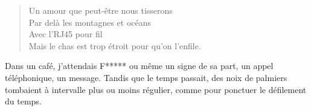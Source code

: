 \begin{verse}%
  \quatrain%
  Un amour que peut-être nous tisserons\\  %
  Par delà les montagnes et océans\\  %
  Avec l’RJ45 pour fil\\  %
  Mais le chas est trop étroit pour qu’on l’enfile.
\end{verse}

\begin{prose}
  Dans un café, j’attendais F***** ou même un signe de sa part, un appel téléphonique, un message. Tandis que le temps passait, des noix de palmiers tombaient à intervalle plus ou moins régulier, comme pour ponctuer le défilement du temps.
\end{prose}

